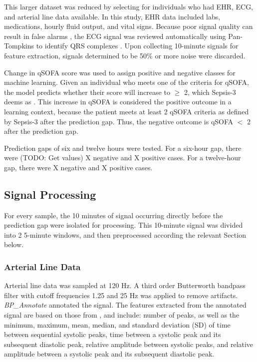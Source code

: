This larger dataset was reduced by selecting for individuals who had EHR, ECG, and arterial line data available. In this study, EHR data included labs, medications, hourly fluid output, and vital signs. Because poor signal quality can result in false alarms \cite{gambarotta_review_2016}, the ECG signal was reviewed automatically using Pan-Tompkins to identify QRS complexes \cite{pantom_1985, matlab-pantom}. Upon collecting 10-minute signals for feature extraction, signals determined to be 50\% or more noise were discarded.

Change in qSOFA score was used to assign positive and negative classes for machine learning. Given an individual who meets one of the criteria for qSOFA, the model predicts whether their score will increase to $\geq$ 2, which Sepsis-3 deems as  \cite{sepsis-3}. This increase in qSOFA is considered the positive outcome in a learning context, because the patient meets at least 2 qSOFA criteria as defined by Sepsis-3 after the prediction gap. Thus, the negative outcome is qSOFA $<$ 2 after the prediction gap.

Prediction gaps of six and twelve hours were tested. For a six-hour gap, there were (TODO: Get values) X negative and X positive cases. For a twelve-hour gap, there were X negative and X positive cases.

\subsection{Signal Processing} \label{sec:methods_sigproc}
For every sample, the 10 minutes of signal occurring directly before the prediction gap were isolated for processing. This 10-minute signal was divided into 2 5-minute windows, and then preprocessed according the relevant Section below.

\subsubsection{Arterial Line Data} \label{sec:methods_art_data}
Arterial line data was sampled at 120 Hz. A third order Butterworth bandpass filter with cutoff frequencies 1.25 and 25 Hz was applied to remove artifacts. \textit{BP\_Annotate} \cite{laurin_bp_annotate_2017} annotated the signal. The features extracted from the annotated signal are based on those from \cite{luo_severity_2012, hernandez_multimodal_2021}, and include: number of peaks, as well as the minimum, maximum, mean, median, and standard deviation (SD) of time between sequential systolic peaks, time between a systolic peak and its subsequent diastolic peak, relative amplitude between systolic peaks, and relative amplitude between a systolic peak and its subsequent diastolic peak.

